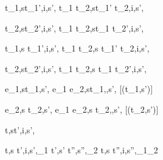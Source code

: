   {t_1,s\symhandle t_1',i,s',\phi}
  {t_1 \And t_2,s\symhandle t_1' \And t_2,\First i,s',\phi}

  {t_2,s\symhandle t_2',i,s',\phi}
  {t_1 \And t_2,s\symhandle t_1 \And t_2',\Second i,s',\phi}


  {t_1,s \symhandle t_1',i,s',\phi}
  {t_1 \Or t_2,s \symhandle t_1' \Or t_2,\First i,s',\phi}

  {t_2,s\symhandle t_2',i,s',\phi }
  {t_1 \Or t_2,s \symhandle t_1 \Or t_2',\Second i,s',\phi}


  {e_1,s\symnormalise t_1,s',\phi}
  {e_1 \Xor e_2,s\symhandle t_1,\Left,s',\phi}
  [\neg\Failing(t_1,s')]

  {e_2,s \symnormalise t_2,s',\phi}
  {e_1 \Xor e_2,s \symhandle t_2,\Right,s',\phi}
  [\neg\Failing(t_2,s')]



  {t,s\symdrive  t',i,s',\phi}


  {t,s \symhandle t',i,s',\phi_1 \Quad
   t',s' \symnormalise t'',s'',\phi_2}
  {t,s \symdrive t'',i,s'',\phi_1\wedge\phi_2}
